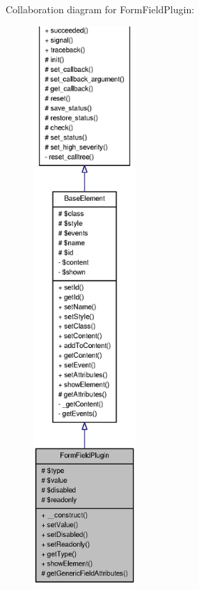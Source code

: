 Collaboration diagram for FormFieldPlugin:\nopagebreak
\begin{figure}[H]
\begin{center}
\leavevmode
\includegraphics[height=600pt]{classFormFieldPlugin__coll__graph}
\end{center}
\end{figure}
